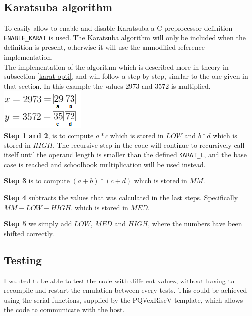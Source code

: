 \subsection{Karatsuba algorithm}
To easily allow to enable and disable Karatsuba a C preprocessor definition \texttt{ENABLE\_KARAT} is used. The Karatsuba algorithm will only be included when the definition is present, otherwise it will use the unmodified reference implementation.\medskip
\\
The implementation of the algorithm which is described more in theory in subsection \ref{karat-opti}, and will follow a step by step, similar to the one given in that section. In this example the values $2973$ and $3572$ is multiplied. \\
\includegraphics{report/images/karat-split.png}\\
\textbf{Step 1 and 2}, is to compute $a * c$ which is stored in $LOW$ and $b * d$ which is stored in $HIGH$. The recursive step in the code will continue to recursively call itself until the operand length is smaller than the defined \texttt{KARAT\_L}, and the base case is reached and schoolbook multiplication will be used instead.

\medskip
\textbf{Step 3} is to compute $(a + b) * (c + d)$ which is stored in $MM$.

\medskip
\textbf{Step 4} subtracts the values that was calculated in the last steps. Specifically $MM - LOW - HIGH$, which is stored in $MED$.

\medskip
\textbf{Step 5} we simply add $LOW$, $MED$ and $HIGH$, where the numbers have been shifted correctly.


\subsection{Testing}
\label{sub-testing}
I wanted to be able to test the code with different values, without having to recompile and restart the emulation between every tests. This could be achieved using the serial-functions, supplied by the PQVexRiscV\cite{PQVexRiscV} template, which allows the code to communicate with the host.
